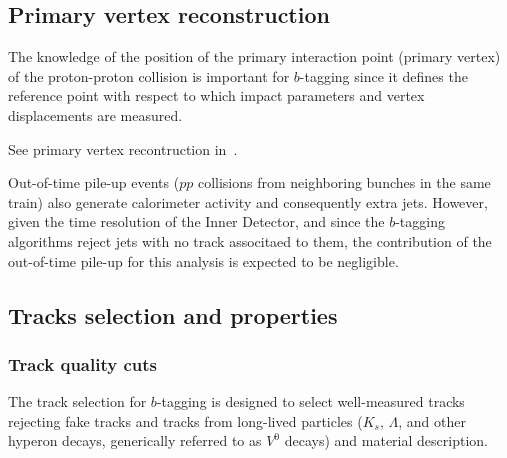 \subsection{Primary vertex reconstruction}

The knowledge of the position of the primary interaction point (primary vertex) of the proton-proton collision is important for $b$-tagging since it defines the reference point with respect to which impact parameters and vertex displacements are measured.

See primary vertex recontruction in~\cite{ATLAS-CONF-2010-069}.


Out-of-time pile-up events ($pp$ collisions from neighboring bunches in the same train) also generate calorimeter activity and consequently extra jets. However, given the time resolution of the Inner Detector, and since the $b$-tagging algorithms reject jets with no track associtaed to them, the contribution of the out-of-time pile-up for this analysis is expected to be negligible.




\subsection{Tracks selection and properties}\label{sec:ObjSelection}

\subsubsection{Track quality cuts}


The track selection for $b$-tagging is designed to select well-measured tracks rejecting fake tracks and tracks from long-lived particles ($K_s$, $\Lambda$, and other hyperon decays, generically referred to as $V^0$ decays) and material description.

